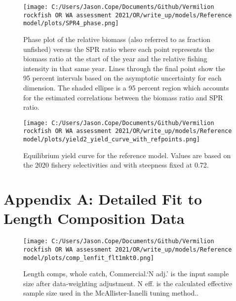 \documentclass[11pt,
  english,
  a4paper,
]{article}
\begin{document}
\begin{figure}
\centering
\texttt{[image: C:/Users/Jason.Cope/Documents/Github/Vermilion rockfish OR WA assessment 2021/OR/write\_up/models/Reference model/plots/SPR4\_phase.png]}
\caption{Phase plot of the relative biomass (also referred to as fraction unfished) versus the SPR ratio where each point represents the biomass ratio at the start of the year and the relative fishing intensity in that same year. Lines through the final point show the 95 percent intervals based on the asymptotic uncertainty for each dimension. The shaded ellipse is a 95 percent region which accounts for the estimated correlations between the biomass ratio and SPR ratio.\label{fig:phase}}
\end{figure}

\tagmcend\tagstructend


\begin{figure}
\centering
\texttt{[image: C:/Users/Jason.Cope/Documents/Github/Vermilion rockfish OR WA assessment 2021/OR/write\_up/models/Reference model/plots/yield2\_yield\_curve\_with\_refpoints.png]}
\caption{Equilibrium yield curve for the reference model. Values are based on the 2020 fishery selectivities and with steepness fixed at 0.72.\label{fig:yield}}
\end{figure}

\tagmcend\tagstructend

\clearpage


\hypertarget{app-a}{%
\section{Appendix A: Detailed Fit to Length Composition Data}\label{app-a}}

\leavevmode\tagmcend\tagstructend


\begin{figure}
\centering
\texttt{[image: C:/Users/Jason.Cope/Documents/Github/Vermilion rockfish OR WA assessment 2021/OR/write\_up/models/Reference model/plots/comp\_lenfit\_flt1mkt0.png]}
\caption{Length comps, whole catch, Commercial.`N adj.' is the input sample size after data-weighting adjustment. N eff. is the calculated effective sample size used in the McAllister-Ianelli tuning method..\label{fig:comp_lenfit_flt1mkt0}}
\end{figure}
\end{document}
